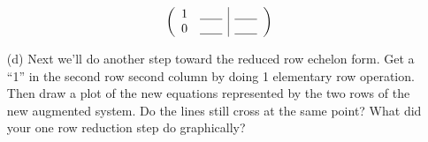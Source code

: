 \begin{problem}
\begin{enumerate}
            \begin{minipage}{0.3\columnwidth}
            \[ \left( \begin{array}{cc|c} 1 &
                        \underline{\hspace{0.25in}} &  \underline{\hspace{0.25in}} \\  0 &
                        \underline{\hspace{0.25in}} &  \underline{\hspace{0.25in}}
                \end{array} \right) \]
            \end{minipage}
            \begin{minipage}{0.6\columnwidth}
            \begin{center}
            \end{center}
            \end{minipage}
        \item[(d)] Next we'll do another step toward the reduced row echelon form.  Get a
            ``1''
            in the second row second column by doing 1 elementary row operation. Then
            draw a plot of the new equations represented by the two rows of the new augmented
            system.  Do the lines still cross at the same point? What did your one row
            reduction step do graphically?


\end{enumerate}
\end{problem}
